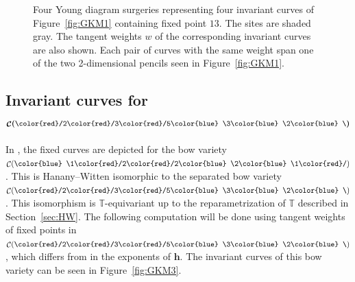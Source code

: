 \documentclass[pdftex]{sigma}
\numberwithin{equation}{section}
\newcommand{\torus}{\mathbb T}
\newcommand{\hb}{\mathbf h}
\def\ttt#1{\text{\tt #1}}
\newcommand\bs{{\color{blue} \char`\\}}
\newcommand\fs{{\color{red}/}}
\DeclareMathOperator{\bowvar}{\mathcal C}
\begin{document}
\begin{figure}
{
}
\hspace*{\fill}

\caption{Four Young diagram surgeries representing four invariant curves of Figure~\ref{fig:GKM1} containing fixed point $13$. The sites are shaded gray. The tangent weights $w$ of the corresponding invariant curves are also shown. Each pair of curves with the same weight span one of the two 2-dimensional pencils seen in Figure~\ref{fig:GKM1}.}
\label{fig:13_yd_surgeries}
\end{figure}

\subsection[Invariant curves ...]{Invariant curves for $\boldsymbol{\bowvar(\ttt{\fs 2\fs 3\fs 5\bs 3\bs 2\bs})}$}
In \cite{RS}, the fixed curves are depicted for the bow variety $\bowvar(\ttt{\bs 1\fs 2\fs 2\bs 2\bs 1\fs})$. This is Hanany--Witten isomorphic to the separated bow variety $\bowvar(\ttt{\fs 2\fs 3\fs 5\bs 3\bs 2\bs})$. This isomorphism is $\torus$-equivariant up to the reparametrization of $\torus$ described in Section~\ref{sec:HW}. The following computation will be done using tangent weights of fixed points in $\bowvar(\ttt{\fs 2\fs 3\fs 5\bs 3\bs 2\bs})$, which differs from \cite{RS} in the exponents of $\hb$. The invariant curves of this bow variety can be seen in Figure~\ref{fig:GKM3}.
\end{document}

